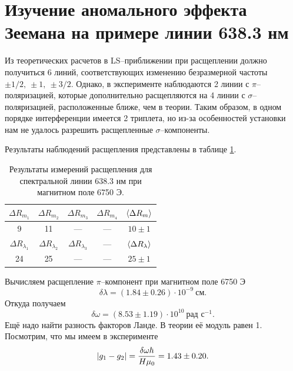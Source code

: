 \documentclass[12pt]{article}
\begin{document}
	\section{Изучение аномального эффекта Зеемана на примере линии 638.3 нм}
	Из теоретических расчетов в LS\---приближении при расщеплении должно получиться 6 линий, соответствующих изменению безразмерной частоты $\pm1/2,\: \pm1,\: \pm3/2$. Однако, в эксперименте наблюдаются 2 линии с $\pi$\---поляризацией, которые дополнительно расщепляются на 4 линии с $\sigma$\---поляризацией, расположенные ближе, чем в теории. Таким образом, в одном порядке интерференции имеется 2 триплета, но из-за особенностей установки нам не удалось разрешить расщепленные $\sigma$\---компоненты.
	\par Результаты наблюдений расщепления представлены в таблице \ref{table:7}.
	\begin{table}[h!]
		\centering
		\begin{tabular}{|c c c c | c |} 
 			\hline
 			$\Delta R_{m_1}$ & $\Delta R_{m_2}$ & $\Delta R_{m_3}$ & $\Delta R_{m_4}$ & $\expval{\Delta R_m}$ \\
 			\hline
 			9 & 11 & \---- & \---- & $10\pm1$ \\
 			\hline\hline
 			$\Delta R_{\lambda_1}$ & $\Delta R_{\lambda_2}$ & $\Delta R_{\lambda_3}$ & \---- & $\expval{\Delta R_\lambda}$ \\
 			\hline
 			24& 25& \----& \---- & $25\pm1$\\
 			\hline
		\end{tabular}
		\caption{Результаты измерений расщепления для спектральной линии 638.3 нм при магнитном поле 6750 Э.}
		\label{table:7}
	\end{table}
	Вычисляем расщепление $\pi$\---компонент при магнитном поле 6750 Э
	\begin{equation}
		\delta\lambda = (1.84\pm0.26)\cdot10^{-9}\ \text{см}.
	\end{equation}
	Откуда получаем
	\begin{equation}
		\delta\omega = (8.53\pm1.19)\cdot10^{10}\ \text{рад с}{}^{-1}.
	\end{equation}
	Ещё надо найти разность факторов Ланде. В теории её модуль равен 1. Посмотрим, что мы имеем в эксперименте %
	\begin{equation}
		\abs{g_1 - g_2} = \dfrac{\delta\omega\hbar}{H\mu_0} = 1.43\pm0.20.
	\end{equation}
\end{document}
